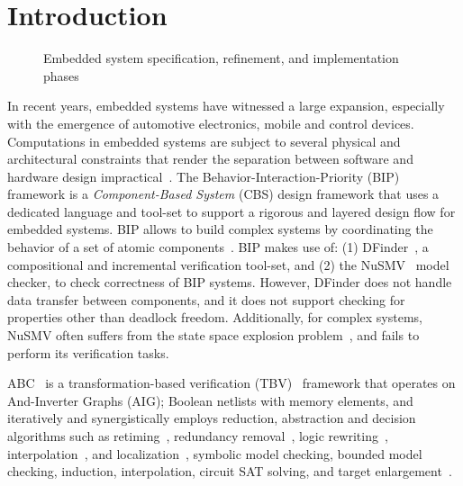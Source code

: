 \section{Introduction}
\label{sect-intro}

\begin{figure}
\resizebox{.9\columnwidth}{!}{
  
}
\caption{Embedded system specification, refinement, and implementation phases}
\label{fig:flow}
\end{figure}

In recent years, embedded systems have witnessed a large 
expansion, especially with  the emergence of automotive 
electronics, mobile and control devices.
Computations in embedded systems are subject to several 
physical and architectural 
constraints that render the separation between software and 
hardware design impractical~\cite{henzinger2006embedded}.
The Behavior-Interaction-Priority (BIP) framework 
is a {\em Component-Based System} (CBS) design framework that uses a dedicated 
language and tool-set to support a rigorous and layered design flow for embedded systems.  
BIP allows to build complex systems by coordinating the behavior of a set of atomic components~\cite{BasuBBCJNS11}.
BIP makes use of: (1) DFinder~\cite{dfinder}, a compositional  
and incremental verification tool-set, and (2) the NuSMV~\cite{nusmv} model checker, to check correctness of BIP systems. 
However, DFinder \cite{BBL14} does not  handle data transfer between components, and it does not support checking for properties other than deadlock freedom. 
Additionally, for complex systems, NuSMV often suffers from the state space explosion 
problem~\cite{sipser2006introduction}, and fails to perform its verification tasks.

ABC~\cite{brayton2010abc} is a transformation-based 
verification (TBV)~\cite{kuehlmann2001transformation} framework that operates on And-Inverter Graphs (AIG); Boolean netlists with
memory elements, and iteratively and synergistically 
employs reduction, abstraction and decision algorithms such as 
retiming~\cite{KuBa01}, redundancy  removal~\cite{HmBPK05,KuMP01,BjesseC00,aziz-fmsd-00}, logic
rewriting~\cite{BjBo04}, interpolation~\cite{McMillan03}, 
and localization~\cite{Wang03}, symbolic model checking, bounded model checking, induction, interpolation,  circuit SAT solving, and target enlargement~\cite{MoGS00,MoMZ01,HoSH00,BaKuAb02,Hari05expert}.


